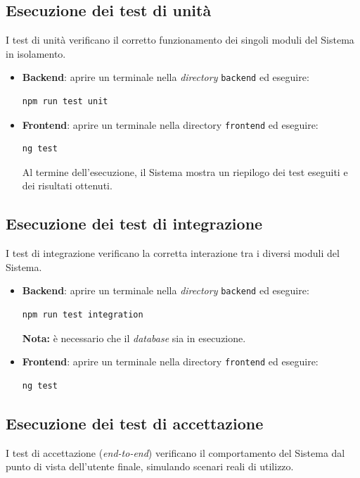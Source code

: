 \documentclass[10pt, letterpaper]{article}
\begin{document}
\subsection{Esecuzione dei test di unità}

I test di unità verificano il corretto funzionamento dei singoli moduli del Sistema in isolamento.
\begin{itemize}
      \item \textbf{Backend}: aprire un terminale nella \textit{directory} \texttt{backend} ed eseguire:
      \begin{verbatim}npm run test unit\end{verbatim}
      \item \textbf{Frontend}: aprire un terminale nella directory \texttt{frontend} ed eseguire:
      \begin{verbatim}ng test\end{verbatim}
      Al termine dell'esecuzione, il Sistema mostra un riepilogo dei test eseguiti e dei risultati ottenuti.
\end{itemize}

\subsection{Esecuzione dei test di integrazione}

I test di integrazione verificano la corretta interazione tra i diversi moduli del Sistema.

\begin{itemize}
      \item \textbf{Backend}: aprire un terminale nella \textit{directory} \texttt{backend} ed eseguire:
      \begin{verbatim}npm run test integration\end{verbatim}
      \textbf{Nota:} è necessario che il \textit{database} sia in esecuzione.
      \item \textbf{Frontend}: aprire un terminale nella directory \texttt{frontend} ed eseguire:
      \begin{verbatim}ng test\end{verbatim}
\end{itemize}


\subsection{Esecuzione dei test di accettazione}

I test di accettazione (\textit{end-to-end}) verificano il comportamento del Sistema dal punto di vista dell'utente finale, simulando scenari reali di utilizzo.
\end{document}
